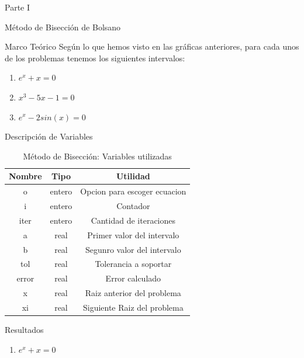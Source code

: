 \documentclass[legalpaper, 12pt]{article}
\def \eqa {\(e^x + x = 0\)}
\def \eqb {\(x^3 - 5x - 1 = 0\)}
\def \eqc {\(e^x - 2sin(x) = 0\)}
\begin{document}
\begin{section}{Parte I}
\begin{subsection}{Método de Bisección de Bolsano}
\begin{subsubsection}{Marco Teórico}
        Según lo que hemos visto en las gráficas anteriores, para cada unos de los problemas tenemos los siguientes intervalos:
        \begin{enumerate}
          \item \eqa\newline
          [ -1, 0 ]
          \item \eqb\newline
          [ -2.5, -2 ] [ -0.5, 0 ] [ 2, 2.5 ]
          \item \eqc\newline
          [ -10, -9 ] [ -6.5, -7 ] [ -4, -3 ]
        \end{enumerate}
      \end{subsubsection}
      \begin{subsubsection}{Descripción de Variables}
        \begin{table}[h]
          \centering
          \begin{tabular}{|c c c|}
            \hline
            Nombre & Tipo & Utilidad\\
            \hline\hline
            o & entero & Opcion para escoger ecuacion \\
            i & entero & Contador \\
            iter & entero & Cantidad de iteraciones \\
            a & real & Primer valor del intervalo \\
            b & real & Segunro valor del intervalo \\
            tol & real & Tolerancia a soportar \\
            error & real & Error calculado \\
            x & real & Raiz anterior del problema \\
            xi & real & Siguiente Raiz del problema\\
            \hline
          \end{tabular}
          \caption{Método de Bisección: Variables utilizadas}
        \end{table}
      \end{subsubsection}
      \newpage
      \begin{subsubsection}{Resultados}
        \begin{enumerate}
          \item \eqa
          \begin{figure}[h]
            \centering

\end{figure}
\end{enumerate}
\end{subsubsection}
\end{subsection}
\end{section}
\end{document}
